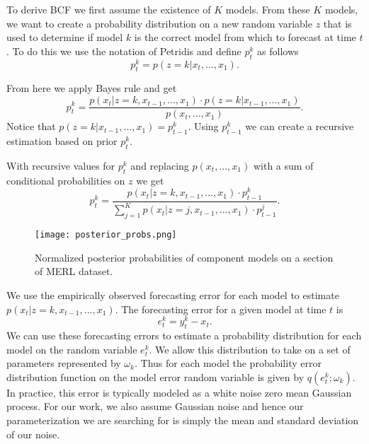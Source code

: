 To derive BCF we first assume the existence of $K$ models.  From these $K$ models, we want to create a probability distribution on a new random variable $z$ that is used to determine if model $k$ is the correct model from which to forecast at time $t$.  To do this we use the notation of Petridis \cite{Petridis2001} and define $p_{t}^{k}$ as follows
\begin{equation}
p_{t}^{k} = p(z = k | x_{t}, ..., x_{1}).
\end{equation}

From here we apply Bayes rule and get
\begin{equation}
p_{t}^{k} = \frac{p(x_{t} | z = k, x_{t - 1}, ..., x_{1}) \cdot p(z = k | x_{t - 1}, ..., x_{1})} {p(x_{t}, ..., x_{1})}.
\end{equation}
\noindent
Notice that $p(z = k | x_{t - 1}, ..., x_{1}) = p_{t - 1}^{k}$.  Using $p_{t - 1}^{k}$ we can create a recursive estimation based on prior $p_{t}^{k}$.

With recursive values for $p_{t}^{k}$ and replacing $p(x_{t}, ..., x_{1})$ with a sum of conditional probabilities on $z$ we get
\begin{equation}
p_{t}^{k} = \frac{p(x_{t} | z = k, x_{t - 1}, ..., x_{1}) \cdot p_{t - 1}^{k}} {\sum_{j = 1}^{K}p(x_{t} | z = j, x_{t - 1}, ..., x_{1}) \cdot p_{t - 1}^{j}}.
\end{equation}

\begin{figure}[t!]
\centering
\texttt{[image: posterior\_probs.png]}
\caption{Normalized posterior probabilities of component models on a section of MERL dataset.}
\label{fig:probsmerl}
\end{figure}

We use the empirically observed forecasting error for each model to estimate $p(x_{t}|z = k, x_{t - 1}, ..., x_{1})$.  The forecasting error for a given model at time $t$ is 
\begin{equation}
e_{t}^{k} = y_{t}^{k} - x_{t}.
\end{equation}
\noindent
We can use these forecasting errors to estimate a probability distribution for each model on the random variable $e_{t}^{k}$.  We allow this distribution to take on a set of parameters represented by $\omega_{k}$.  Thus for each model the probability error distribution function on the model error random variable is given by $q(e_{t}^{k};\omega_{k})$.  In practice, this error is  typically modeled as a white noise zero mean Gaussian process.  For our work, we also assume Gaussian noise and hence our parameterization we are searching for is simply the mean and standard deviation of our noise.  

